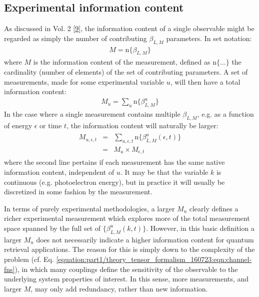 \documentclass[letterpaper,table,10pt,english]{jupyterBook}
\begin{document}
\subsection{Experimental information content}
\label{\detokenize{part1/theory_info_content_200723:experimental-information-content}}\label{\detokenize{part1/theory_info_content_200723:sec-expt-info-content}}
\sphinxAtStartPar
As discussed in  Vol. 2 {[}\hyperlink{cite.backmatter/bibliography:id677}{9}{]}, the information content of a single observable might be regarded as simply the number of contributing \(\beta_{L,M}\) parameters. In set notation:
\begin{equation}\label{equation:part1/theory_info_content_200723:eq:BLM-set}
\begin{split}M=\mathrm{n}\{\beta_{L,M}\}\end{split}
\end{equation}
\sphinxAtStartPar
where \(M\) is the information content of the measurement, defined as
\(\mathrm{n}\{...\}\) the cardinality (number of elements) of the set of
contributing parameters. A set of measurements, made for some
experimental variable \(u\), will then have a total information content:
\begin{equation*}
\begin{split}M_{u}=\sum_{u}\mathrm{n}\{\beta_{L,M}^{u}\}\end{split}
\end{equation*}
\sphinxAtStartPar
In the case where a single measurement contains multiple \(\beta_{L,M}\),
e.g. as a function of energy \(\epsilon\) or time \(t\), the information
content will naturally be larger:
\begin{equation*}
\begin{split}\begin{aligned}
M_{u,\epsilon,t} & = & \sum_{u,\epsilon,t}\mathrm{n}\{\beta_{L,M}^{u}(\epsilon,t)\}\\
 & = & M_{u}\times M_{\epsilon,t}\end{aligned}\end{split}
\end{equation*}
\sphinxAtStartPar
where the second line pertains if each measurement has the same native
information content, independent of \(u\). It may be that the variable \(k\)
is continuous (e.g. photoelectron energy), but in practice it will
usually be discretized in some fashion by the measurement.

\sphinxAtStartPar
In terms of purely experimental methodologies, a larger \(M_{u}\) clearly
defines a richer experimental measurement which explores more of the
total measurement space spanned by the full set of
\(\{\beta_{L,M}^{u}(k,t)\}\). However, in this basic definition a larger
\(M_{u}\) does not necessarily indicate a higher information content for
quantum retrieval applications. The reason for this is simply down to
the complexity of the problem (cf. Eq. \eqref{equation:part1/theory_tensor_formalism_160723:eqn:channel-fns}), in which many couplings define the sensitivity of the observable to the underlying system properties of
interest. In this sense, more measurements, and larger \(M\), may only add
redundancy, rather than new information.
\end{document}
